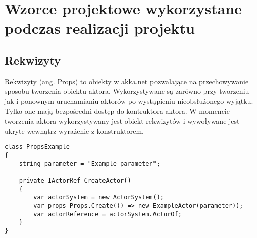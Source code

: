 \chapter{Wzorce projektowe wykorzystane podczas realizacji projektu}
\section{Rekwizyty}
Rekwizyty (ang. Props) to obiekty w akka.net pozwalające na przechowywanie sposobu tworzenia obiektu aktora. 
Wykorzystywane są zarówno przy tworzeniu jak i ponownym uruchamianiu aktorów po wystąpieniu nieobsłużonego wyjątku.
Tylko one mają bezpośredni dostęp do kontruktora aktora. W momencie tworzenia aktora wykorzystywany jest obiekt rekwizytów i wywoływane jest ukryte wewnątrz wyrażenie z konstruktorem.

\begin{lstlisting}[caption = Przykład użycia rekwizytów, captionpos=b]
class PropsExample    
{
    string parameter = "Example parameter";
    
    private IActorRef CreateActor()
    {
        var actorSystem = new ActorSystem();
        var props Props.Create(() => new ExampleActor(parameter));
        var actorReference = actorSystem.ActorOf; 
    }
}
\end{lstlisting}

